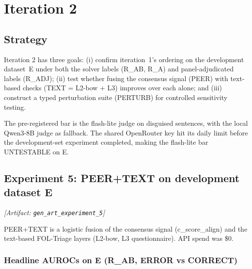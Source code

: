 \documentclass[11pt,letterpaper]{article}
\begin{document}
\section{Iteration 2}

\subsection{Strategy}

Iteration 2 has three goals: (i) confirm iteration~1's ordering on the development dataset~E under both the solver labels (R\_AB, R\_A) and panel-adjudicated labels (R\_ADJ); (ii) test whether fusing the consensus signal (PEER) with text-based checks (TEXT = L2-bow + L3) improves over each alone; and (iii) construct a typed perturbation suite (PERTURB) for controlled sensitivity testing.

The pre-registered bar is the flash-lite judge on disguised sentences, with the local Qwen3-8B judge as fallback. The shared OpenRouter key hit its daily limit before the development-set experiment completed, making the flash-lite bar UNTESTABLE on E.

\subsection{Experiment 5: PEER+TEXT on development dataset E}
\label{sec:exp5}
\noindent\textit{[Artifact: \texttt{gen\_art\_experiment\_5}]}

PEER+TEXT is a logistic fusion of the consensus signal (c\_score\_align) and the text-based FOL-Triage layers (L2-bow, L3 questionnaire). API spend was \$0.

\subsubsection{Headline AUROCs on E (R\_AB, ERROR vs CORRECT)}
\end{document}
